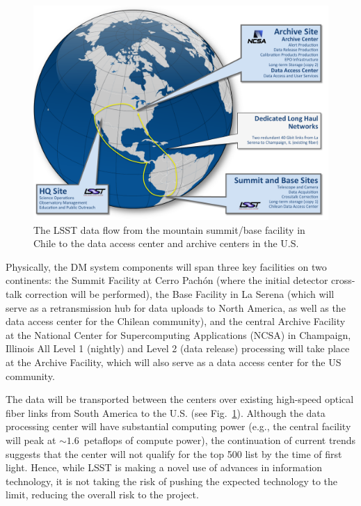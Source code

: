 \begin{figure}
%
%
\hskip 0.25in
\includegraphics[width=0.95\hsize,clip]{DMX2.pdf}
\caption{The LSST data flow from the mountain summit/base facility in
Chile to the data access center and archive centers in the U.S.}
\label{Fig:DM2}
\end{figure}

Physically, the DM system components will span three key facilities on two
continents: the Summit Facility at  Cerro Pach\'on (where the initial
detector cross-talk
correction will be performed), the Base Facility in La Serena (which will serve
as a retransmission hub for data
uploads to North America, as well as the data access center for the Chilean
community), and the central Archive Facility at the National Center
for Supercomputing Applications (NCSA) in Champaign, Illinois
All Level 1 (nightly) and Level 2 (data release) processing will take place at the
Archive Facility, which will also serve as a data access center
for the US community.

The data will be transported between the centers over existing high-speed optical fiber
links from South America to the U.S. (see Fig.~\ref{Fig:DM2}).
Although the data processing center will have substantial computing
power (e.g., the central facility will peak at $\sim 1.6$~petaflops of
compute power), the continuation of current trends suggests that the center will
not qualify for the top 500 list by the time of first light.
Hence, while LSST is making a novel use of advances in information technology,
it is not taking the risk of pushing the expected technology to the limit, reducing
the overall risk to the project.
\\

